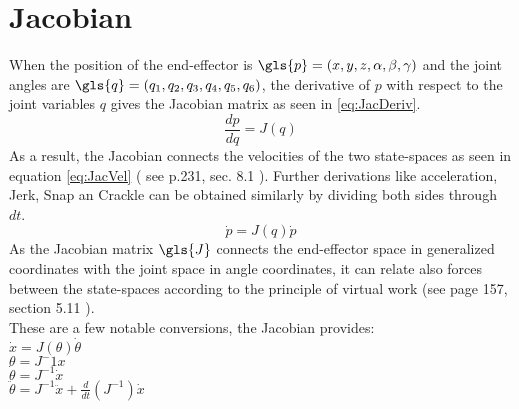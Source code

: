 \section{Jacobian} \label{sec:Jacobian}
When the position of the end-effector is $\gls{p}=(x,y,z,\alpha,\beta,\gamma)$ and the joint angles are  $\gls{q}=(q_1, q_2, q_3, q_4, q_5, q_6)$, the derivative of $p$ with respect to the joint variables $q$ gives the Jacobian matrix as seen in  \ref{eq:JacDeriv}.\\
\begin{equation} \label{eq:JacDeriv}
	\frac{dp}{dq}=J(q)
\end{equation}
\medskip
As a result, the Jacobian connects the velocities of the two state-spaces as seen in equation \ref{eq:JacVel} ( see \cite{CorkeRoboticVisionControl} p.231, sec. 8.1 ). Further derivations like acceleration, Jerk, Snap an Crackle can be obtained similarly by dividing both sides through $dt$. \\
\begin{equation}\label{eq:JacVel}
	\dot{p}=J(q)\dot{p}
\end{equation}
As the Jacobian matrix $\gls{J}$ connects the end-effector space in generalized coordinates with the joint space in angle coordinates, it can relate also forces between the state-spaces according to the principle of virtual work (see \cite{IndustrialRobotArm} page 157, section 5.11 ).\\
These are a few notable conversions, the Jacobian provides:\\
$ \dot{x}=J(\theta)\dot{\theta} $ \\
$ \theta=J{^-1}x $ \\
$ \dot{\theta} = J^{-1} \dot{x} $\\
$ \ddot{\theta} = J^{-1} \ddot{x} + \frac{d}{dt}(J^{-1}) \dot{x} $\\

